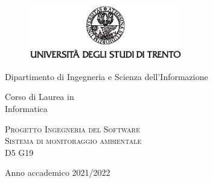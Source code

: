\pagestyle{plain}
\thispagestyle{empty}

\graphicspath{{assets/figures/}}

\begin{center}
	\begin{figure}[h!]
		\centerline{\includegraphics[width=0.6\textwidth]{Img/logo_unitn_black_center.eps}}
	\end{figure}

	\vspace{2 cm}

	\LARGE{Dipartimento di Ingegneria e Scienza dell’Informazione}

	\vspace{1 cm}

	\Large{
		Corso di Laurea in\\
		Informatica
	}

	\vspace{2 cm}
	\Large\textsc{Progetto Ingegneria del Software\\}
	\vspace{1 cm}
	\Huge\textsc{Sistema di monitoraggio ambientale\\}
	\vspace{1cm}
	\Large{D5 G19}

	\vspace{4cm}

	\Large{Anno accademico 2021/2022}
\end{center}